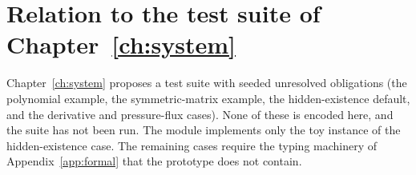 \section{Relation to the test suite of Chapter~\ref{ch:system}}

Chapter~\ref{ch:system} proposes a test suite with seeded unresolved obligations (the polynomial example, the symmetric-matrix example, the hidden-existence default, and the derivative and pressure-flux cases). None of these is encoded here, and the suite has not been run. The module  implements only the toy instance of the hidden-existence case. The remaining cases require the typing machinery of Appendix~\ref{app:formal} that the prototype does not contain.
